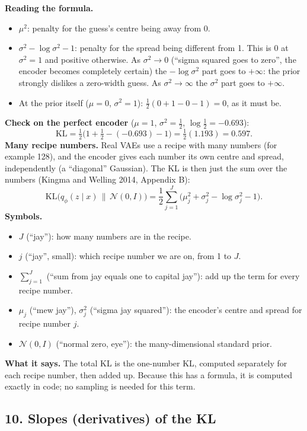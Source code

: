 \textbf{Reading the formula.}
\begin{itemize}[leftmargin=1.5em]
\item $\mu^2$: penalty for the guess's centre being away from 0.
\item $\sigma^2 - \log\sigma^2 - 1$: penalty for the spread being different from 1. This is 0 at $\sigma^2 = 1$ and positive otherwise. As $\sigma^2 \to 0$ (``sigma squared goes to zero'', the encoder becomes completely certain) the $-\log\sigma^2$ part goes to $+\infty$: the prior strongly dislikes a zero-width guess. As $\sigma^2 \to \infty$ the $\sigma^2$ part goes to $+\infty$.
\item At the prior itself ($\mu = 0$, $\sigma^2 = 1$): $\tfrac12(0 + 1 - 0 - 1) = 0$, as it must be.
\end{itemize}
\textbf{Check on the perfect encoder} ($\mu = 1$, $\sigma^2 = \tfrac12$, $\log\tfrac12 = -0.693$):
\[
\mathrm{KL} = \tfrac{1}{2}\big(1 + \tfrac{1}{2} - (-0.693) - 1\big) = \tfrac{1}{2}(1.193) = 0.597.
\]
\textbf{Many recipe numbers.} Real VAEs use a recipe with many numbers (for example 128), and the encoder gives each number its own centre and spread, independently (a ``diagonal'' Gaussian). The KL is then just the sum over the numbers (Kingma and Welling 2014, Appendix B):
\[
\mathrm{KL}\big(q_\phi(z \mid x)\,\|\,\mathcal{N}(0, I)\big) = \frac{1}{2}\sum_{j=1}^{J}\big(\mu_j^2 + \sigma_j^2 - \log\sigma_j^2 - 1\big).
\]
\textbf{Symbols.}
\begin{itemize}[leftmargin=1.5em, itemsep=0pt]
\item $J$ (``jay''): how many numbers are in the recipe.
\item $j$ (``jay'', small): which recipe number we are on, from 1 to $J$.
\item $\sum_{j=1}^{J}$ (``sum from jay equals one to capital jay''): add up the term for every recipe number.
\item $\mu_j$ (``mew jay''), $\sigma_j^2$ (``sigma jay squared''): the encoder's centre and spread for recipe number $j$.
\item $\mathcal{N}(0, I)$ (``normal zero, eye''): the many-dimensional standard prior.
\end{itemize}
\textbf{What it says.} The total KL is the one-number KL, computed separately for each recipe number, then added up. Because this has a formula, it is computed exactly in code; no sampling is needed for this term.

\subsection*{10. Slopes (derivatives) of the KL}

